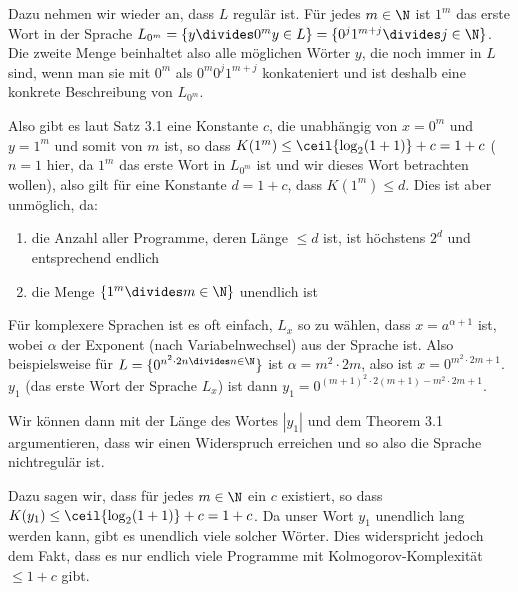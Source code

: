 Dazu nehmen wir wieder an, dass $L$ regulär ist. Für jedes $m \in \N$ ist $1^m$ das erste Wort in der Sprache $L_{0^m} = \{ y \divides 0^m y \in L \} = \{ 0^j 1^{m + j} \divides j \in \N \}$.
Die zweite Menge beinhaltet also alle möglichen Wörter $y$, die noch immer in $L$ sind, wenn man sie mit $0^m$ als $0^m 0^j 1^{m + j}$ konkateniert
und ist deshalb eine konkrete Beschreibung von $L_{0^m}$.

Also gibt es laut Satz 3.1 eine Konstante $c$, die unabhängig von $x = 0^m$ und $y = 1^m$ und somit von $m$ ist, so dass $K(1^m) \leq \ceil{\log_2(1 + 1)} + c = 1 + c$
($n = 1$ hier, da $1^m$ das erste Wort in $L_{0^m}$ ist und wir dieses Wort betrachten wollen),
also gilt für eine Konstante $d = 1 + c$, dass $K(1^m) \leq d$.
Dies ist aber unmöglich, da:
\begin{enumerate}[label=(\roman*)]
    \item die Anzahl aller Programme, deren Länge $\leq d$ ist, ist höchstens $2^d$ und entsprechend endlich
    \item die Menge $\{ 1^m \divides m \in \N \}$ unendlich ist
\end{enumerate}

Für komplexere Sprachen ist es oft einfach, $L_x$ so zu wählen, dass $x = a^{\alpha + 1}$ ist, wobei $\alpha$ der Exponent (nach Variabelnwechsel) aus der Sprache ist.
Also beispielsweise für $L = \{ 0^{n^2 \cdot 2n \divides n \in \N }\}$ ist $\alpha = m^2 \cdot 2m$, also ist $x = 0^{m^2 \cdot 2m + 1}$.
$y_1$ (das erste Wort der Sprache $L_x$) ist dann $y_1 = 0^{(m + 1)^2 \cdot 2(m + 1) - m^2 \cdot 2m + 1}$.

Wir können dann mit der Länge des Wortes $|y_1|$ und dem Theorem 3.1 argumentieren, dass wir einen Widerspruch erreichen und so also die Sprache nichtregulär ist.

Dazu sagen wir, dass für jedes $m \in \N$ ein $c$ existiert, so dass $K(y_1) \leq \ceil{\log_2(1 + 1)} + c = 1 + c$.
Da unser Wort $y_1$ unendlich lang werden kann, gibt es unendlich viele solcher Wörter. 
Dies widerspricht jedoch dem Fakt, dass es nur endlich viele Programme mit Kolmogorov-Komplexität $\leq 1 + c$ gibt.

\numberingOn
